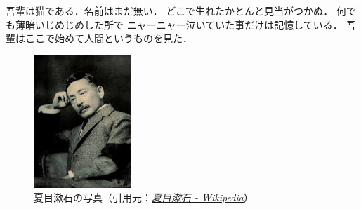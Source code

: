 \documentclass[a4j,uplatex]{jsarticle}
\newcommand{\linedhref}[2]{\underline{\href{#1}{\emph{#2}}}}
\begin{document}
吾輩は猫である．名前はまだ無い\cite{Soseki1905}．
どこで生れたかとんと見当がつかぬ．
何でも薄暗いじめじめした所で
ニャーニャー泣いていた事だけは記憶している．
吾輩はここで始めて人間というものを見た．

\begin{figure}[H]
	\begin{center}
		\includegraphics[height=5cm]{img/natsume_soseki.jpeg}
		\caption{夏目漱石の写真（引用元：\linedhref{https://ja.wikipedia.org/wiki/\%E5\%A4\%8F\%E7\%9B\%AE\%E6\%BC\%B1\%E7\%9F\%B3}{夏目漱石 - Wikipedia}）}
	\end{center}
\end{figure}



\end{document}
